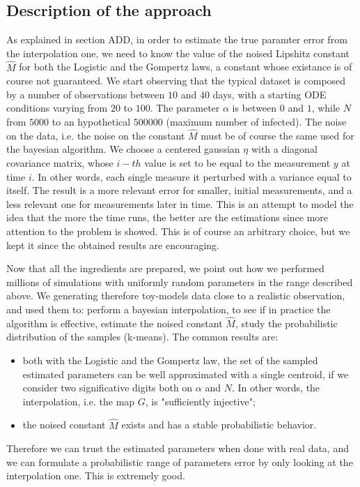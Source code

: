 \documentclass[6pt]{article}
\begin{document}
\subsection {Description of the approach}
As explained in section ADD, in order to estimate the true paramter error
from the interpolation one, we need to know the value of the noised
Lipshitz constant $\hat{M}$ for both the Logistic and the Gompertz laws, 
a constant whose
existance is of course not guaranteed.
We start observing that the typical dataset is composed 
by a number of observations
between $10$ and $40$ days, with a starting ODE conditions varying from $20$ to
$100$. The parameter $\alpha$ is between $0$ and $1$, while $N$ from $5000$
to an hypothetical $500000$ (maximum number of infected).
The noise on the data, i.e. the noise on the constant $\hat{M}$
must be of course the same used for the bayesian algorithm.
We choose a centered gaussian
$\eta$ with a diagonal covariance matrix, whose 
$i-th$ value is set to be equal to the measurement
$y$ at time $i$. In other words, each single measure it perturbed with a
variance equal to itself. The result is a more relevant error for smaller,
initial measurements, and a less relevant one for measurements later in time.
This is an attempt to model the idea that the more the time runs,
the better are the estimations since more attention to the problem
is showed. This is of course
an arbitrary choice, but we kept it since the obtained results are
encouraging.


Now that all the ingredients are prepared, we point out how we performed
millions of simulations with uniformly random parameters in the range
described above. We generating therefore toy-models data close to a realistic
observation, and used them to: perform a bayesian interpolation,
to see if in practice the algorithm is effective, estimate the noised constant
$\hat{M}$, study the probabilistic distribution of the samples (k-means).
The common results are:
\begin{itemize}
	\item both with the Logistic and the Gompertz law, the set of the
		sampled estimated parameters can be well approximated
		with a single centroid, if we consider two significative
		digits both on $\alpha$ and $N$. In other words,
		the interpolation, i.e. the map $G$, is
		"sufficiently injective";
	\item the noised constant $\hat{M}$ exists and has a stable
		probabilistic behavior.
\end{itemize}
Therefore we can trust the estimated parameters when done with real data,
and we can formulate a probabilistic range of parameters error
by only looking at the interpolation one. This is extremely good.
\end{document}
